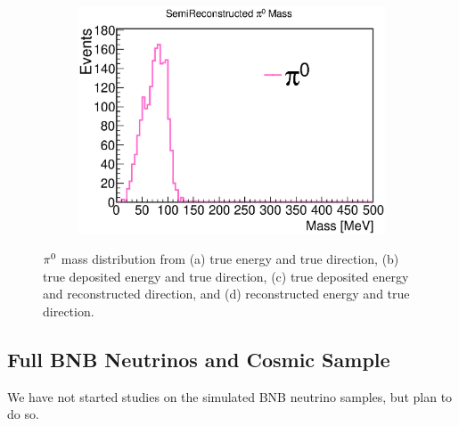 \begin{figure}[htbp]
\begin{center}
\begin{subfigure}{0.45\textwidth}
\caption{}
\end{subfigure}
\begin{subfigure}{0.45\textwidth}
\includegraphics[width=0.9\linewidth]{figs/mc/single_pi0/RecoEMCThetaPi0Mass.eps}
\caption{}
\end{subfigure}
\caption{${\pi}^0$ mass distribution from (a) true energy and true direction,
(b) true deposited energy and true direction, (c) true deposited energy
and reconstructed direction, and (d) reconstructed energy and true direction.}
\label{fig:mc_reco_single_pi0}
\end{center}
\end{figure}
\subsection{Full BNB Neutrinos and Cosmic Sample}
\label{sec:bnb}

We have not started studies on the simulated BNB neutrino samples,
but plan to do so.\\


